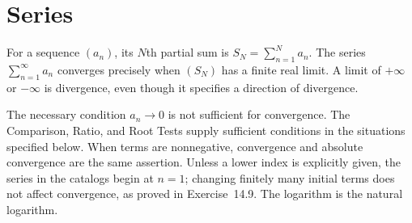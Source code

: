 \section{Series}
\label{sec:series}
For a sequence $(a_n)$, its $N$th partial sum is
$S_N=\sum_{n=1}^{N}a_n$. The series $\sum_{n=1}^{\infty}a_n$
converges precisely when $(S_N)$ has a finite real limit. A limit of
$+\infty$ or $-\infty$ is divergence, even though it specifies a
direction of divergence.

The necessary condition $a_n\to0$ is not sufficient for convergence.
The Comparison, Ratio, and Root Tests supply sufficient conditions
in the situations specified below. When terms are nonnegative,
convergence and absolute convergence are the same assertion.
Unless a lower index is explicitly given, the series in the catalogs
begin at $n=1$; changing finitely many initial terms does not affect
convergence, as proved in Exercise~14.9. The logarithm is the natural
logarithm.



